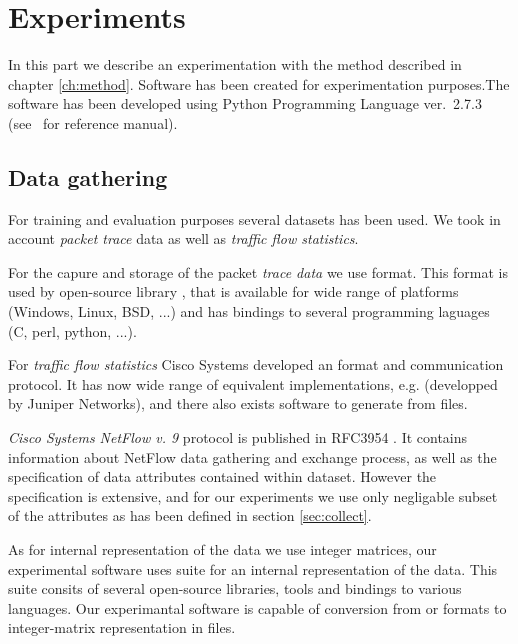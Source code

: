 \chapter{Experiments}\label{sec:experiments}

In this part we describe an experimentation with the method described in chapter
\ref{ch:method}. Software  has been created for
experimentation purposes.The software has been developed using 
Python Programming Language ver.~2.7.3
(see~\cite{rossum2011python} for reference manual).

\section{Data gathering}

For training and evaluation purposes several datasets has been used. We took in account
\emph{packet trace} data as well as \emph{traffic flow statistics}. 

For the capure and storage of the packet \emph{trace data} we use  format.
This format is used by open-source library  \cite{jacobson2009libpcap}, 
that is available for wide range of platforms (Windows, Linux, BSD, ...) and 
has bindings to several programming laguages (C, perl, python, ...).

For \emph{traffic flow statistics}  Cisco Systems developed an 
 format and communication protocol.
It has now wide range of equivalent implementations, e.g.  
(developped by Juniper Networks), and there also exists software to generate 
 from  files.

\emph{Cisco Systems NetFlow v. 9}  protocol is published in RFC3954 \cite{claise2007rfc}.
It contains information about NetFlow data gathering and exchange process, as well
as the specification of data attributes contained within dataset.
However the specification is extensive, and for our experiments we use only negligable 
subset of the attributes as has been defined in section \ref{sec:collect}.

As for internal representation of the data we use integer matrices,
our experimental software uses  suite \cite{folk2011overview}
for an internal representation of the data. This suite consits of several 
open-source libraries, tools and bindings to various languages.
Our experimantal software is capable of conversion from  or  
formats to integer-matrix representation in  files.

